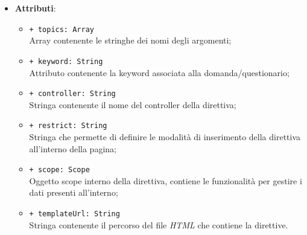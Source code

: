 \begin{itemize}
\begin{itemize}
	\end{itemize}
	\item \textbf{Attributi}:
	\begin{itemize}
		\item \texttt{+ topics: Array} \\ Array contenente le stringhe dei nomi degli argomenti;
		\item \texttt{+ keyword: String} \\ Attributo contenente la keyword associata alla domanda/questionario;
		\item \texttt{+ controller: String} \\ Stringa contenente il nome del controller della direttiva;
		\item \texttt{+ restrict: String} \\ Stringa che permette di definire le modalità di inserimento della direttiva all'interno della pagina;
		\item \texttt{+ scope: Scope} \\ Oggetto scope interno della direttiva, contiene le funzionalità per gestire i dati presenti all'interno;
		\item \texttt{+ templateUrl: String} \\ Stringa contenente il percorso del file \textit{HTML} che contiene la direttive.
	\end{itemize}
\end{itemize}